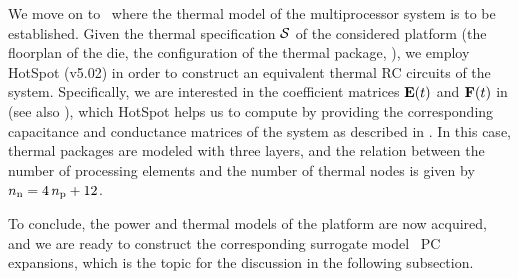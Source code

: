We move on to \ where the thermal model of the multiprocessor system is to be established.
Given the thermal specification $\mathcal{S}$ of the considered platform (the floorplan of the die, the configuration of the thermal package, \etc), we employ HotSpot (v5.02) \cite{skadron2004} in order to construct an equivalent thermal RC circuits of the system.
Specifically, we are interested in the coefficient matrices $\mCF(\t)$ and $\mCS(\t)$ in  (see also ), which HotSpot helps us to compute by providing the corresponding capacitance and conductance matrices of the system as described in .
In this case, thermal packages are modeled with three layers, and the relation between the number of processing elements and the number of thermal nodes is given by ${n_\text{n}} = 4 \, {n_\text{p}} + 12$.

To conclude, the power and thermal models of the platform are now acquired, and we are ready to construct the corresponding surrogate model \via\ PC expansions, which is the topic for the discussion in the following subsection.
